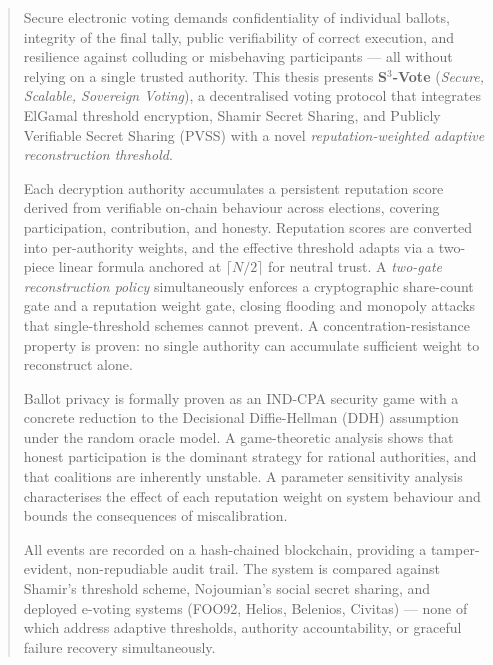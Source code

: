 \documentclass[12pt,a4paper]{article}
\theoremstyle{definition}
\theoremstyle{remark}
\begin{document}
\begin{abstract}
\noindent
Secure electronic voting demands confidentiality of individual ballots,
integrity of the final tally, public verifiability of correct execution,
and resilience against colluding or misbehaving participants — all without
relying on a single trusted authority.
This thesis presents \textbf{S$^3$-Vote} (\textit{Secure, Scalable,
Sovereign Voting}), a decentralised voting protocol that integrates
ElGamal threshold encryption, Shamir Secret Sharing, and
Publicly Verifiable Secret Sharing (PVSS) with a novel
\emph{reputation-weighted adaptive reconstruction threshold}.

Each decryption authority accumulates a persistent reputation score
derived from verifiable on-chain behaviour across elections, covering
participation, contribution, and honesty.
Reputation scores are converted into per-authority weights, and the
effective threshold adapts via a two-piece linear formula anchored at
$\lceil N/2 \rceil$ for neutral trust.
A \emph{two-gate reconstruction policy} simultaneously enforces a
cryptographic share-count gate and a reputation weight gate, closing
flooding and monopoly attacks that single-threshold schemes cannot prevent.
A concentration-resistance property is proven: no single authority can
accumulate sufficient weight to reconstruct alone.

Ballot privacy is formally proven as an IND-CPA security game with a
concrete reduction to the Decisional Diffie-Hellman (DDH) assumption
under the random oracle model.
A game-theoretic analysis shows that honest participation is the dominant
strategy for rational authorities, and that coalitions are inherently
unstable.
A parameter sensitivity analysis characterises the effect of each
reputation weight on system behaviour and bounds the consequences of
miscalibration.

All events are recorded on a hash-chained blockchain, providing a
tamper-evident, non-repudiable audit trail.
The system is compared against Shamir's threshold scheme, Nojoumian's
social secret sharing, and deployed e-voting systems (FOO92, Helios,
Belenios, Civitas) — none of which address adaptive thresholds, authority
accountability, or graceful failure recovery simultaneously.
\end{abstract}

\newpage
\tableofcontents
\listoffigures

\newpage
\end{document}
